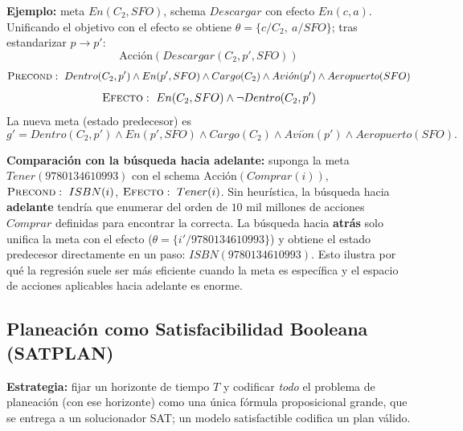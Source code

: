 \textbf{Ejemplo:} meta $En(C_2,SFO)$, schema $Descargar$ con efecto $En(c,a)$. Unificando el objetivo
con el efecto se obtiene $\theta=\{c/C_2,\ a/SFO\}$; tras estandarizar $p\to p'$:
\[
    \text{Acci\'on}(Descargar(C_2,p',SFO))
\]
\[
    \textsc{Precond}:\ Dentro(C_2,p')\land En(p',SFO)\land Cargo(C_2)\land Avi\acute{o}n(p')\land
    Aeropuerto(SFO)
\]
\[
    \textsc{Efecto}:\ En(C_2,SFO)\land \neg Dentro(C_2,p')
\]
La nueva meta (estado predecesor) es
\[
    g' = Dentro(C_2,p')\land En(p',SFO)\land Cargo(C_2)\land Avi\acute{o}n(p')\land
    Aeropuerto(SFO).
\]

\textbf{Comparación con la búsqueda hacia adelante:} suponga la meta $Tener(9780134610993)$ con el
schema $\text{Acci\'on}(Comprar(i))$, $\textsc{Precond}:\ ISBN(i)$, $\textsc{Efecto}:\ Tener(i)$. Sin
heurística, la búsqueda hacia \textbf{adelante} tendría que enumerar del orden de $10$ mil millones de
acciones $Comprar$ definidas para encontrar la correcta. La búsqueda hacia \textbf{atrás} solo unifica
la meta con el efecto ($\theta=\{i'/9780134610993\}$) y obtiene el estado predecesor directamente en
un paso: $ISBN(9780134610993)$. Esto ilustra por qué la regresión suele ser más eficiente cuando la
meta es específica y el espacio de acciones aplicables hacia adelante es enorme.

\subsection{Planeación como Satisfacibilidad Booleana (SATPLAN)}

\textbf{Estrategia:} fijar un horizonte de tiempo $T$ y codificar \emph{todo} el problema de
planeación (con ese horizonte) como una única fórmula proposicional grande, que se entrega a un
solucionador SAT; un modelo satisfactible codifica un plan válido.

